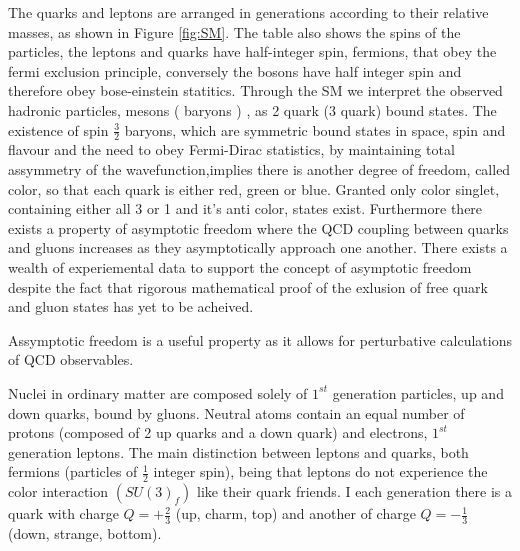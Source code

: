 The quarks and leptons are arranged in generations according to their relative masses, as shown in Figure \ref{fig:SM}. The table also shows the spins of the particles, the leptons and quarks have half-integer spin, fermions, that obey the fermi exclusion principle, conversely the bosons have half integer spin and therefore obey bose-einstein statitics. Through the SM we interpret the observed hadronic particles, mesons ( baryons ) , as 2 quark (3 quark) bound states. The existence of spin $\frac{3}{2}$ baryons, which are symmetric bound states in space, spin and flavour and the need to obey Fermi-Dirac statistics, by maintaining total assymmetry of the wavefunction,implies there is another degree of freedom, called color, so that each quark is either red, green or blue. Granted only color singlet, containing either all 3 or 1 and it's anti color, states exist. Furthermore there exists a property of asymptotic freedom where the QCD coupling between quarks and gluons increases as they asymptotically approach one another. There exists a wealth of experiemental data to support the concept of asymptotic freedom despite the fact that rigorous mathematical proof of the exlusion of free quark and gluon states has yet to be acheived.

Assymptotic freedom is a useful property as it allows for perturbative calculations of QCD observables.


 Nuclei in ordinary matter are composed solely of $1^{st}$ generation particles, up and down quarks, bound by gluons. Neutral atoms contain an equal number of protons (composed of 2 up quarks and a down quark) and electrons, $1^{st}$ generation leptons. The main distinction between leptons and quarks, both fermions (particles of $\frac{1}{2}$ integer spin), being that leptons do not experience the color interaction $(SU(3)_f)$ like their quark friends. I each generation there is a quark with charge $Q = + \frac{2}{3}$ (up, charm, top) and another of charge $Q = - \frac{1}{3}$ (down, strange, bottom).



